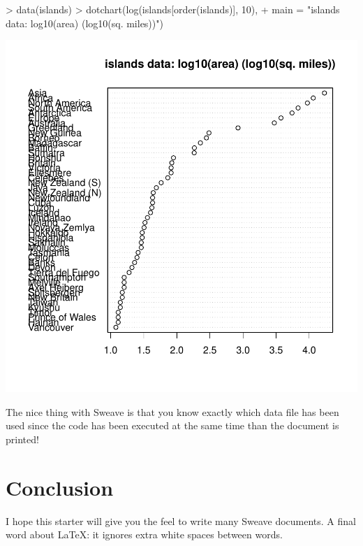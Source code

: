 \documentclass[a4paper]{article}
\begin{document}
\begin{Schunk}
\begin{Sinput}
> data(islands)
> dotchart(log(islands[order(islands)], 10),
+    main = "islands data: log10(area) (log10(sq. miles))")
\end{Sinput}
\end{Schunk}
\includegraphics{Little_Sweave-008}

The nice thing with Sweave is that you know exactly which data file
has been used since the code has been executed at the same time than
the document is printed!

\section{Conclusion}

I hope this starter will give you the feel to write many Sweave
documents. A final word about LaTeX:	it
ignores  		 		 		 		 		 		 		 		 		 		 		 		 		 		 		 		 		 		 		 		 		 		 		 		 		 		 		 		 		 		extra
white  		 		 		 		 		 		 		 		 		 		 		 		 		 		 		spaces
 		 		 		 		 		 		 		 		 		 		between
words.
\end{document}

